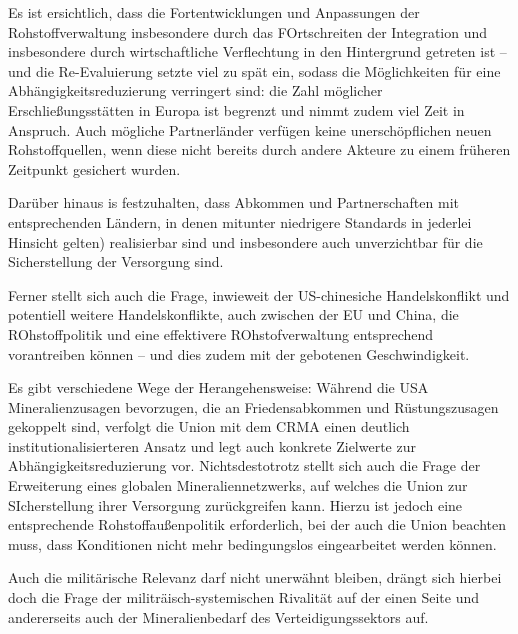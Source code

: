 \documentclass[12pt,a4paper,oneside]{book} %
\begin{document}
Es ist ersichtlich, dass die Fortentwicklungen und Anpassungen der Rohstoffverwaltung insbesondere durch das FOrtschreiten der Integration und insbesondere durch wirtschaftliche Verflechtung in den Hintergrund getreten ist -- und die Re-Evaluierung setzte viel zu spät ein, sodass die Möglichkeiten für eine Abhängigkeitsreduzierung verringert sind: die Zahl möglicher Erschließungsstätten in Europa ist begrenzt und nimmt zudem viel Zeit in Anspruch. Auch mögliche Partnerländer verfügen keine unerschöpflichen neuen Rohstoffquellen, wenn diese nicht bereits durch andere Akteure zu einem früheren Zeitpunkt gesichert wurden.

Darüber hinaus is festzuhalten, dass Abkommen und Partnerschaften mit entsprechenden Ländern, in denen mitunter niedrigere Standards in jederlei Hinsicht gelten) realisierbar sind und insbesondere auch unverzichtbar für die Sicherstellung der Versorgung sind.

Ferner stellt sich auch die Frage, inwieweit der US-chinesiche Handelskonflikt und potentiell weitere Handelskonflikte, auch zwischen der EU und China, die ROhstoffpolitik und eine effektivere ROhstofverwaltung entsprechend vorantreiben können -- und dies zudem mit der gebotenen Geschwindigkeit.

Es gibt verschiedene Wege der Herangehensweise: Während die USA Mineralienzusagen bevorzugen, die an Friedensabkommen und Rüstungszusagen gekoppelt sind, verfolgt die Union mit dem CRMA einen deutlich institutionalisierteren Ansatz und legt auch konkrete Zielwerte zur Abhängigkeitsreduzierung vor. Nichtsdestotrotz stellt sich auch die Frage der Erweiterung eines globalen Mineraliennetzwerks, auf welches die Union zur SIcherstellung ihrer Versorgung zurückgreifen kann. Hierzu ist jedoch eine entsprechende Rohstoffaußenpolitik erforderlich, bei der auch die Union beachten muss, dass Konditionen nicht mehr bedingungslos eingearbeitet werden können. 

Auch die militärische Relevanz darf nicht unerwähnt bleiben, drängt sich hierbei doch die Frage der militräisch-systemischen Rivalität auf der einen Seite und andererseits auch der Mineralienbedarf des Verteidigungssektors auf.

	
\end{document}
